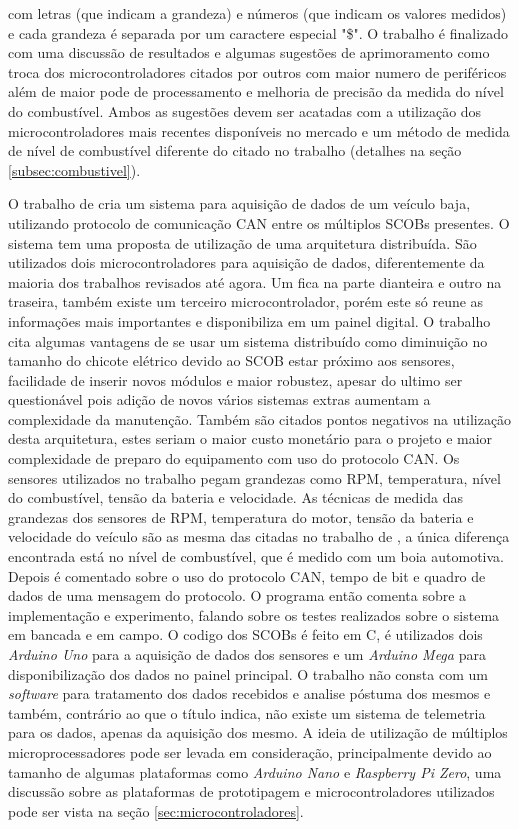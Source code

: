 com letras (que indicam a grandeza) e números (que indicam os valores medidos) e cada grandeza é separada por um caractere especial "\$". O trabalho é finalizado com uma discussão de resultados e algumas sugestões de aprimoramento como troca dos microcontroladores citados por outros com maior numero de periféricos além de maior pode de processamento e melhoria de precisão da medida do nível do combustível. Ambos as sugestões devem ser acatadas com a utilização dos microcontroladores mais recentes disponíveis no mercado e um método de medida de nível de combustível diferente do citado no trabalho (detalhes na seção \ref{subsec:combustivel}).

O trabalho de \cite{Nunes2016} cria um sistema para aquisição de dados de um veículo baja, utilizando protocolo de comunicação CAN entre os múltiplos SCOBs presentes. O sistema tem uma proposta de utilização de uma arquitetura distribuída. São utilizados dois microcontroladores para aquisição de dados, diferentemente da maioria dos trabalhos revisados até agora. Um fica na parte dianteira e outro na traseira, também existe um terceiro microcontrolador, porém este só reune as informações mais importantes e disponibiliza em um painel digital. O trabalho cita algumas vantagens de se usar um sistema distribuído como diminuição no tamanho do chicote elétrico devido ao SCOB estar próximo aos sensores, facilidade de inserir novos módulos e maior robustez, apesar do ultimo ser questionável pois adição de novos vários sistemas extras aumentam a complexidade da manutenção. Também são citados pontos negativos na utilização desta arquitetura, estes seriam o maior custo monetário para o projeto e maior complexidade de preparo do equipamento com uso do protocolo CAN. Os sensores utilizados no trabalho pegam grandezas como RPM, temperatura, nível do combustível, tensão da bateria e velocidade. As técnicas de medida das grandezas dos sensores de RPM, temperatura do motor, tensão da bateria e velocidade do veículo são as mesma das citadas no trabalho de \cite{Dias2010}, a única diferença encontrada está no nível de combustível, que é medido com um boia automotiva. Depois é comentado sobre o uso do protocolo CAN, tempo de bit e quadro de dados de uma mensagem do protocolo. O programa então comenta sobre a implementação e experimento, falando sobre os testes realizados sobre o sistema em bancada e em campo. O codigo dos SCOBs é feito em C, é utilizados dois \textit{Arduino Uno} para a aquisição de dados dos sensores e um \textit{Arduino Mega} para disponibilização dos dados no painel principal. O trabalho não consta com um \textit{software} para tratamento dos dados recebidos e analise póstuma dos mesmos e também, contrário ao que o título indica, não existe um sistema de telemetria para os dados, apenas da aquisição dos mesmo. A ideia de utilização de múltiplos microprocessadores pode ser levada em consideração, principalmente devido ao tamanho de algumas plataformas como \textit{Arduino Nano} e \textit{Raspberry Pi Zero}, uma discussão sobre as plataformas de prototipagem e microcontroladores utilizados pode ser vista na seção \ref{sec:microcontroladores}.

